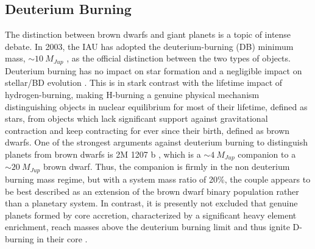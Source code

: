 \subsection {Deuterium Burning}
The distinction between brown dwarfs and giant planets is a topic of intense debate. 
In 2003, the IAU has adopted the deuterium-burning (DB) minimum mass, $\sim 10~ M_{Jup}$ , as the official distinction between the
two types of objects. 
Deuterium burning has no impact on star formation and a negligible impact on stellar/BD evolution \citep{Chabrier2000c}. 
This is in stark contrast with the lifetime impact of hydrogen-burning, making H-burning a genuine physical mechanism
distinguishing objects in nuclear equilibrium for most of their lifetime, defined as stars, from objects which lack 
significant support against gravitational contraction and keep contracting for ever since their birth, defined as brown dwarfs.
One of the strongest arguments against deuterium burning to distinguish planets from brown dwarfs is
2M 1207 b \citep{Chauvin2005}, which is a $\sim 4~ M_{Jup}$ companion to a $\sim 20~ M_{Jup}$ brown dwarf. Thus, the companion is 
firmly in the non deuterium burning mass regime, but with a system mass ratio of 20\%, the couple appears to be best
described as an extension of the brown dwarf binary population rather than a planetary system. In contrast, it is
presently not excluded that genuine planets formed by core accretion, characterized by a significant heavy element 
enrichment, reach masses above the deuterium burning limit and thus ignite D-burning in their core \citep{Baraffe2008, Molliere2012, Bodenheimer2013}.

